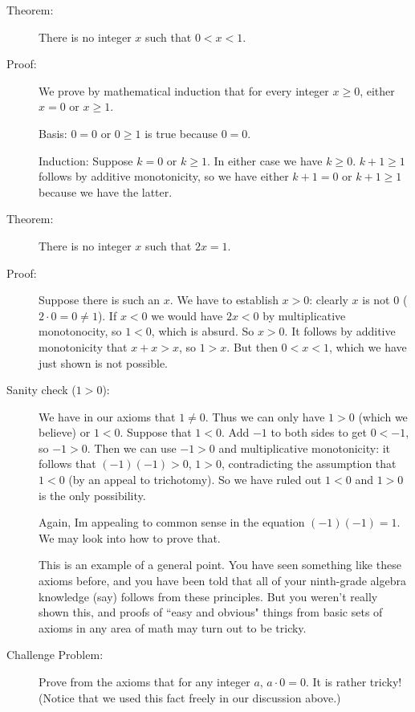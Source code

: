 \documentclass[12pt]{article}
\begin{document}
\begin{description}

\item[Theorem:]  There is no integer $x$ such that $0<x<1$.

\item[Proof:]  We prove by mathematical induction that for every integer $x\geq 0$, either $x = 0$ or $x \geq 1$.

Basis: $0=0$ or $0 \geq 1$ is true because $0=0$.

Induction:  Suppose $k=0$ or $k \geq 1$.   In either case we have $k \geq 0$.  $k+1\geq 1$ follows by additive monotonicity, so we have either $k+1=0$ or $k+1\geq 1$ because we have the latter.

\item[Theorem:]  There is no integer $x$ such that $2x=1$.

\item[Proof:]  Suppose there is such an $x$.  We have to establish $x>0$:  clearly $x$ is not 0
($2 \cdot 0 = 0 \neq 1$).  If $x<0$ we would have $2x<0$ by multiplicative monotonocity, so $1<0$, which is absurd.
So $x>0$.  It follows by additive monotonicity that $x+x>x$, so $1>x$.  But then $0<x<1$, which we have just shown is not possible.

\item[Sanity check ($1>0$):]  We have in our axioms that $1 \neq 0$.  Thus we can only have $1>0$ (which we believe)
or $1<0$.  Suppose that $1<0$.  Add $-1$ to both sides to get $0<-1$, so $-1>0$.  Then we can use $-1>0$ and multiplicative monotonicity:  it follows that $(-1)(-1)>0$, $1>0$, contradicting the assumption that $1<0$ (by an appeal to trichotomy).  So we have ruled out $1<0$ and $1>0$ is the only possibility.

Again, Im appealing to common sense in the equation $(-1)(-1)=1$.  We may look into how to prove that.

This is an example of a general point.  You have seen something like these axioms before, and you have been told that all of your ninth-grade algebra knowledge (say) follows from these principles.  But you weren't really shown this, and proofs of
``easy and obvious" things from basic sets of axioms in any area of math may turn out to be tricky.

\item[Challenge Problem:]  Prove from the axioms that for any integer $a$, $a \cdot 0 = 0$.  It is rather tricky!  (Notice that we used this fact freely in our discussion above.)

\end{description}
\end{document}
